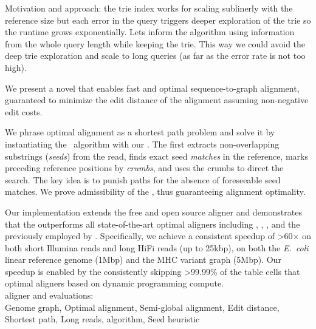 %
Motivation and approach: the trie index works for scaling sublinerly with the
reference size but each error in the query triggers deeper exploration of the
trie so the runtime grows exponentially. Lets inform the \A algorithm using
information from the whole query length while keeping the trie. This way we
could avoid the deep trie exploration and scale to long queries (as far as the
error rate is not too high).

We present a novel \A \emph{\seedh} that enables fast and optimal
sequence-to-graph alignment, guaranteed to minimize the edit distance of the
alignment assuming non-negative edit costs.

We phrase optimal alignment as a shortest path problem and solve it by
instantiating the \A~algorithm with our \seedh. The \seedh first extracts
non-overlapping substrings (\emph{seeds}) from the read, finds exact seed
\emph{matches} in the reference, marks preceding reference positions by
\emph{crumbs}, and uses the crumbs to direct the \A search. The key idea is to
punish paths for the absence of foreseeable seed matches. We prove admissibility
of the \seedh, thus guaranteeing alignment optimality.

\qquad Our implementation extends the free and open source aligner and
demonstrates that the \seedh outperforms all state-of-the-art optimal aligners
including \graphaligner, \vargas, \pasgal, and the \prefixh previously employed
by \astarix. Specifically, we achieve a consistent speedup of >60$\times$ on
both short Illumina reads and long HiFi reads (up to 25kbp), on both the
\textit{E.~coli} linear reference genome (1Mbp) and the MHC variant graph
(5Mbp). Our speedup is enabled by the \seedh consistently skipping >99.99\% of
the table cells that optimal aligners based on dynamic programming
compute.\\

\astarix aligner and evaluations: \astarixurl\\

Genome graph, Optimal alignment, Semi-global alignment, Edit distance, Shortest
path, Long reads, \A algorithm, Seed heuristic

